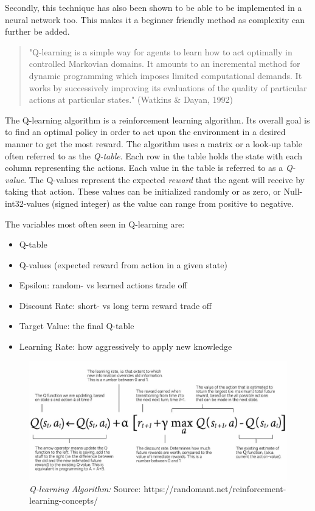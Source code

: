 \documentclass[
a4paper,
11pt,
english
]{report}
\newenvironment{myitemize}{
    \begin{itemize}
    \setlength{\itemsep}{0pt}
    \setlength{\parskip}{0pt}
    \setlength{\parsep}{0pt}
}{\end{itemize}}
\begin{document}
Secondly, this technique has also been shown to be able to be implemented in a neural network too. This makes it a beginner friendly method as complexity can further be added.

\begin{quote}
    "Q-learning is a simple way for agents to learn how to act optimally in controlled Markovian domains. It amounts to an incremental method for dynamic programming which imposes limited computational demands. It works by successively improving its evaluations of the quality of particular actions at particular states." (Watkins & Dayan, 1992)
\end{quote}

The Q-learning algorithm is a reinforcement learning algorithm. Its overall goal is to find an optimal policy in order to act upon the environment in a desired manner to get the most reward. The algorithm uses a matrix or a look-up table often referred to as the \textit{Q-table}. Each row in the table holds the state with each column representing the actions. Each value in the table is referred to as a \textit{Q-value}. The Q-values represent the expected \textit{reward} that the agent will receive by taking that action. These values can be initialized randomly or as zero, or Null-int32-values (signed integer) as the value can range from positive to negative.

The variables most often seen in Q-learning are:

\begin{myitemize}
    \item Q-table
    \item Q-values (expected reward from action in a given state)
    \item Epsilon: random- vs learned actions trade off
    \item Discount Rate: short- vs long term reward trade off
    \item Target Value: the final Q-table
    \item Learning Rate: how aggressively to apply new knowledge
\end{myitemize}

\begin{figure}[h]
    \centering
    \includegraphics[width=.95\textwidth]{q_learning_algorithm}
    \caption{\textit{Q-learning Algorithm:} Source: https://randomant.net/reinforcement-learning-concepts/}
    \label{fig:q_learning_algorithm}
\end{figure}
\end{document}
